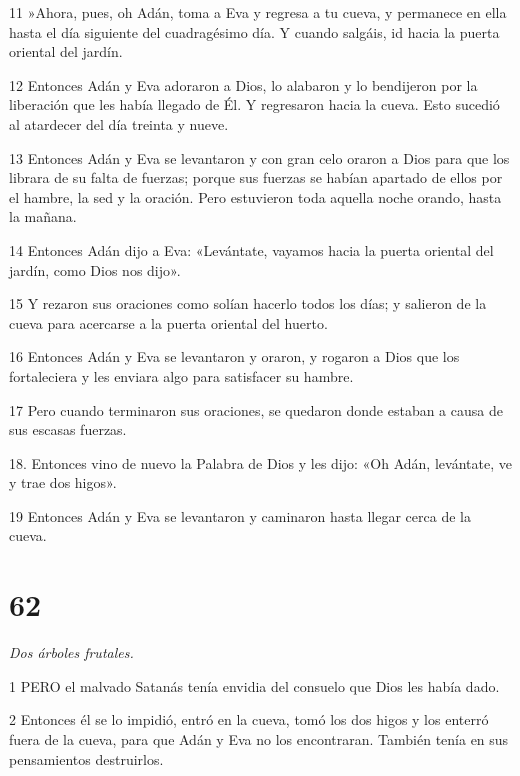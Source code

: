 \par 11 »Ahora, pues, oh Adán, toma a Eva y regresa a tu cueva, y permanece en ella hasta el día siguiente del cuadragésimo día. Y cuando salgáis, id hacia la puerta oriental del jardín.

\par 12 Entonces Adán y Eva adoraron a Dios, lo alabaron y lo bendijeron por la liberación que les había llegado de Él. Y regresaron hacia la cueva. Esto sucedió al atardecer del día treinta y nueve.

\par 13 Entonces Adán y Eva se levantaron y con gran celo oraron a Dios para que los librara de su falta de fuerzas; porque sus fuerzas se habían apartado de ellos por el hambre, la sed y la oración. Pero estuvieron toda aquella noche orando, hasta la mañana.

\par 14 Entonces Adán dijo a Eva: «Levántate, vayamos hacia la puerta oriental del jardín, como Dios nos dijo».

\par 15 Y rezaron sus oraciones como solían hacerlo todos los días; y salieron de la cueva para acercarse a la puerta oriental del huerto.

\par 16 Entonces Adán y Eva se levantaron y oraron, y rogaron a Dios que los fortaleciera y les enviara algo para satisfacer su hambre.

\par 17 Pero cuando terminaron sus oraciones, se quedaron donde estaban a causa de sus escasas fuerzas.

18. Entonces vino de nuevo la Palabra de Dios y les dijo: «Oh Adán, levántate, ve y trae dos higos».

\par 19 Entonces Adán y Eva se levantaron y caminaron hasta llegar cerca de la cueva.

\chapter{62}

\par \textit{Dos árboles frutales.}

\par 1 PERO el malvado Satanás tenía envidia del consuelo que Dios les había dado.

\par 2 Entonces él se lo impidió, entró en la cueva, tomó los dos higos y los enterró fuera de la cueva, para que Adán y Eva no los encontraran. También tenía en sus pensamientos destruirlos.

